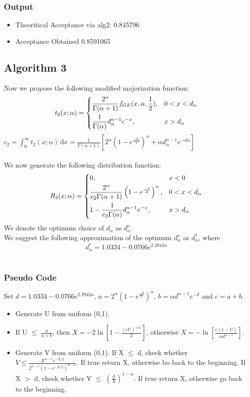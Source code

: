 \documentclass[11pt]{article}
\begin{document}
\subsubsection{Output}
\begin{itemize}
\item Theoritical Acceptance via alg2: 0.845796 
\item Acceptance Obtained 0.8591065  
\end{itemize}
\subsection{Algorithm 3}
Now we propose the following modified majorization function:
\[
t_2(x;\alpha)=
\begin{dcases}
\frac{2^{\alpha}}{\Gamma(\alpha+1)}f_{GE}(x,\alpha,\frac{1}{2}), & 0<x<d_\alpha\\
\frac{1}{\Gamma(\alpha)}d^{\alpha-1}_\alpha e^{-x}, & x>d_\alpha
\end{dcases}
\]
$c_2=\int_0^\infty
t_2(x;\alpha)\,\mathrm{d}x=\frac{1}{\Gamma(\alpha+1)}\left[2^{\alpha}\left(1-e^{\frac{-d_\alpha}{2}}\right)^{\alpha}+\alpha d^{\alpha-1}_\alpha e^{-d\alpha}\right]$\\ \\
We now generate the following distribution function:
\[
R_2(x;\alpha)=
\begin{dcases}
0, & x<0\\
\frac{2^\alpha}{c_2 \Gamma(\alpha+1)}\left(1-e^{\frac{-x}{2}}\right)^{\alpha}, & 0<x<d_\alpha\\
1-\frac{1}{c_2 \Gamma(\alpha)}d^{\alpha-1}_\alpha e^{-x}, & x>d_\alpha\\
\end{dcases}
\]
We denote the optimum choice of $d_\alpha$ as $d_\alpha^o$.\\
We suggest the following approximation of the optimum $d_\alpha^o$ as $d_\alpha^*$, where $$d_\alpha^* = 1.0334-0.0766e^{2.2942\alpha}$$\\
\subsubsection{Pseudo Code}
Set $d = 1.0334-0.0766e^{2.2942\alpha}$, $a = 2^\alpha\left(1-e^{\frac{-d}{2}}\right)^\alpha$, $b = \alpha d^{\alpha-1}e^{-d}$ and $c = a + b$.
\begin{itemize}
\item Generate U from uniform (0,1).
\item If U $\leq$ $\frac{a}{a+b}$, then $X = -2\ln\left[1-\frac{(cU)^{1/\alpha}}{2}\right]$, otherwise $X = -\ln\left[\frac{c(1-U)}{\alpha d^{\alpha-1}}\right]$.
\item Generate V from uniform (0,1). If X $\leq$ d, check whether $V \leq \frac{X^{\alpha-1}e^{-X/2}}{2^{\alpha-1}\left(1-e^{-X/2}\right)^{\alpha-1}}.$ If true return X, otherwise bo back to the beginning. If X $>$ d, check whether V $\leq$ $\left(\frac{d}{X}\right)^{1-\alpha}$. If true return X, otherwise go back to the beginning.
\end{itemize}
\end{document}
